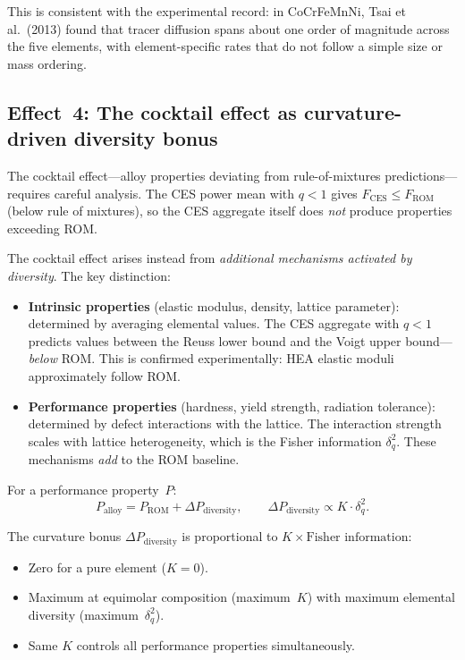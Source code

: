 \documentclass[12pt,letterpaper]{article}
\theoremstyle{definition}
\begin{document}
This is consistent with the experimental record: in CoCrFeMnNi, Tsai et al.\ (2013) found that tracer diffusion spans about one order of magnitude across the five elements, with element-specific rates that do not follow a simple size or mass ordering.

\subsection{Effect~4: The cocktail effect as curvature-driven diversity bonus}

The cocktail effect---alloy properties deviating from rule-of-mixtures predictions---requires careful analysis.  The CES power mean with $q < 1$ gives $F_{\mathrm{CES}} \leq F_{\mathrm{ROM}}$ (below rule of mixtures), so the CES aggregate itself does \emph{not} produce properties exceeding ROM.

The cocktail effect arises instead from \emph{additional mechanisms activated by diversity}.  The key distinction:

\begin{itemize}
  \item \textbf{Intrinsic properties} (elastic modulus, density, lattice parameter): determined by averaging elemental values.  The CES aggregate with $q < 1$ predicts values between the Reuss lower bound and the Voigt upper bound---\emph{below} ROM.  This is confirmed experimentally: HEA elastic moduli approximately follow ROM.
  \item \textbf{Performance properties} (hardness, yield strength, radiation tolerance): determined by defect interactions with the lattice.  The interaction strength scales with lattice heterogeneity, which is the Fisher information $\delta_q^2$.  These mechanisms \emph{add} to the ROM baseline.
\end{itemize}

For a performance property~$P$:
\begin{equation}\label{eq:cocktail}
  P_{\mathrm{alloy}} = P_{\mathrm{ROM}} + \Delta P_{\mathrm{diversity}}, \qquad \Delta P_{\mathrm{diversity}} \propto K \cdot \delta_q^2.
\end{equation}

The curvature bonus $\Delta P_{\mathrm{diversity}}$ is proportional to $K \times \text{Fisher information}$:
\begin{itemize}
  \item Zero for a pure element ($K = 0$).
  \item Maximum at equimolar composition (maximum~$K$) with maximum elemental diversity (maximum~$\delta_q^2$).
  \item Same $K$ controls all performance properties simultaneously.
\end{itemize}
\end{document}
